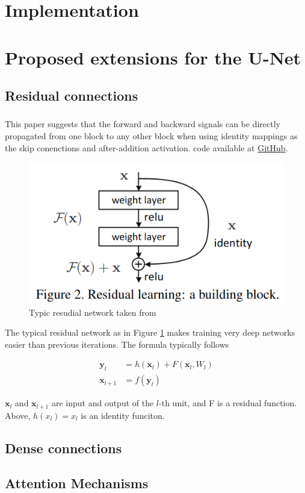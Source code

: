 \documentclass[11pt]{article}
\begin{document}
\section{Implementation}

\section{Proposed extensions for the U-Net}

\subsection{Residual connections}

\subsubsection{\cite{identity-mappings-drns}}

This paper suggests that the forward and backward signals can be directly propagated from one block to any other block when using identity mappings as the skip conenctions and after-addition activation. code available at \href{https://github.com/KaimingHe/resnet-1k-layers/blob/master/resnet-pre-act.lua}{GitHub}.

\begin{figure}[H]
    \centering
    \includegraphics[width=0.4\linewidth]{images/residualArchitecture.png}
    \caption{Typic resudial network taken from \cite{drn-for-image-recognition}}
    \label{residual-architecture}
\end{figure}

The typical residual network as in Figure \ref{residual-architecture} makes training very deep networks easier than previous iterations. The formula typically follows 

\begin{align}
    \textbf{y}_l &= h(\textbf{x}_l) + F(\textbf{x}_l, W_l) \\
    \textbf{x}_{l+1} &= f(\textbf{y}_l)
\end{align}

$\textbf{x}_l$ and $\textbf{x}_{l+1}$ are input and output of the $l$-th unit, and F is a residual function. Above, 
$h(x_l)=x_l$ is an identity funciton. 

\subsubsection{\cite{v-net}}

\subsection{Dense connections}

\cite{tiramisu-densenet}

\subsection{Attention Mechanisms}

\cite{attention-u-net}

\printbibliography
\end{document}
